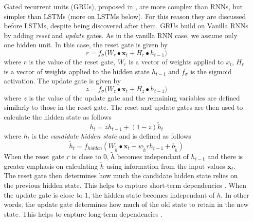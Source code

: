 \documentclass[]{article}
\begin{document}
Gated recurrent units (GRUs), proposed in \cite{DBLP:journals/corr/ChoMGBSB14}, are more complex than RNNs, but simpler than LSTMs (more on LSTMs below). For this reason they are discussed before LSTMs, despite being discovered after them.
\newline
\newline
GRUs build on Vanilla RNNs by adding \textit{reset} and \textit{update} gates. As in the vanilla RNN case, we assume only one hidden unit. In this case, the reset gate is given by
\begin{equation}
r = f_{\sigma} \bigg( W_{r} \bullet \textbf{x}_{t}  + H_{r} \bullet h_{t-1} \bigg)
\end{equation}
where $r$ is the value of the reset gate, $W_{r}$ is a vector of weights applied to $x_{t}$, $H_{r}$ is a vector of weights applied to the hidden state $h_{t-1}$ and $f_{\sigma}$ is the sigmoid activation. The update gate is given by
\begin{equation}
z = f_{\sigma} \bigg( W_{z} \bullet \textbf{x}_{t}  + H_{z} \bullet h_{t-1} \bigg)
\end{equation}
where $z$ is the value of the update gate and the remaining variables are defined similarly to those in the reset gate.
\newline
\newline
The reset and update gates are then used to calculate the hidden state as follows
\begin{equation}
h_{t} = zh_{t-1} + (1-z) \tilde{h}_{t}
\end{equation}
where $\tilde{h}_{t}$ is the \textit{candidate hidden state} and is defined as follows
\begin{equation}
\tilde{h}_{t} = f_{hidden}(W_{\tilde{h}} \bullet \textbf{x}_{t} + w_{\tilde{h}} r h_{t-1} + b_{\tilde{h}})
\end{equation}
When the reset gate $r$ is close to $0$, $\tilde{h}$ becomes independant of $h_{t-1}$ and there is greater emphasis on calculating $\tilde{h}$ using information from the input values $\textbf{x}_{t}$. The reset gate then determines how much the candidate hidden state relies on the previous hidden state. This helps to capture short-term dependencies \cite{zhang_lipton_li_smola}.
\newline
\newline
When the update gate is close to $1$, the hidden state becomes independant of $\tilde{h}$. In other words, the update gate determines how much of the old state to retain in the new state. This helps to capture long-term dependencies \cite{zhang_lipton_li_smola}.
\end{document}
